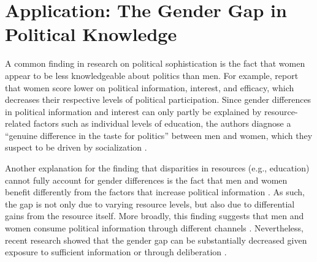 \documentclass[12pt]{article}
\begin{document}


\section*{Application: The Gender Gap in Political Knowledge}



A common finding in research on political sophistication is the fact that women appear to be less knowledgeable about politics than men. For example, \citet{verba1997knowing} report that women score lower on political information, interest, and efficacy, which decreases their respective levels of political participation. Since gender differences in political information and interest can only partly be explained by resource-related factors such as individual levels of education, the authors diagnose a ``genuine difference in the taste for politics'' between men and women, which they suspect to be driven by socialization \citep[see also][]{wolak2011roots}.

Another explanation for the finding that disparities in resources (e.g., education) cannot fully account for gender differences is the fact that men and women benefit differently from the factors that increase political information \citep{dow2009gender}. As such, the gap is not only due to varying resource levels, but also due to differential gains from the resource itself. More broadly, this finding suggests that men and women consume political information through different channels \citep[see also][]{pietryka2013analysis}. Nevertheless, recent research showed that the gender gap can be substantially decreased given exposure to sufficient information \citep[e.g.][]{jerit2017revisiting} or through deliberation \citep{fraile2014does}.
\end{document}
